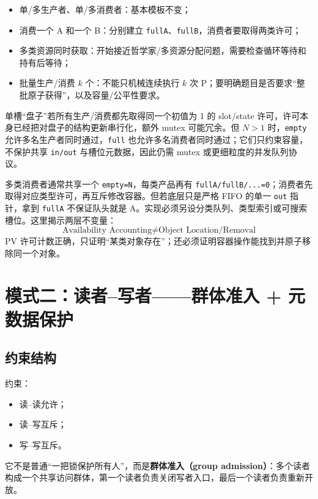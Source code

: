 \documentclass[11pt,a4paper]{ctexart}
\newcommand{\kw}[1]{\textbf{#1}}
\newcommand{\code}[1]{\texttt{#1}}
\begin{document}
\begin{itemize}
\item 单/多生产者、单/多消费者：基本模板不变；
\item 消费一个 A 和一个 B：分别建立 \code{fullA}、\code{fullB}，消费者要取得两类许可；
\item 多类资源同时获取：开始接近哲学家/多资源分配问题，需要检查循环等待和持有后等待；
\item 批量生产/消费 $k$ 个：不能只机械连续执行 $k$ 次 P；要明确题目是否要求“整批原子获得”，以及容量/公平性要求。
\end{itemize}

\begin{exam}
单槽“盘子”若所有生产/消费都先取得同一个初值为 1 的 slot/state 许可，许可本身已经把对盘子的结构更新串行化，额外 mutex 可能冗余。但 $N>1$ 时，\code{empty} 允许多名生产者同时通过，\code{full} 也允许多名消费者同时通过；它们只约束容量，不保护共享 \code{in/out} 与槽位元数据，因此仍需 mutex 或更细粒度的并发队列协议。
\end{exam}

\begin{method}
多类消费者通常共享一个 \code{empty=N}，每类产品再有 \code{fullA/fullB/...=0}；消费者先取得对应类型许可，再互斥修改容器。但若底层只是严格 FIFO 的单一 \code{out} 指针，拿到 \code{fullA} 不保证队头就是 A。实现必须另设分类队列、类型索引或可搜索槽位。这里揭示两层不变量：
\[
\boxed{\text{Availability Accounting}\neq\text{Object Location/Removal}}
\]
PV 许可计数正确，只证明“某类对象存在”；还必须证明容器操作能找到并原子移除同一个对象。
\end{method}

\section{模式二：读者--写者——群体准入 + 元数据保护}

\subsection{约束结构}

约束：
\begin{itemize}
\item 读--读允许；
\item 读--写互斥；
\item 写--写互斥。
\end{itemize}
它不是普通“一把锁保护所有人”，而是\kw{群体准入（group admission）}：多个读者构成一个共享访问群体，第一个读者负责关闭写者入口，最后一个读者负责重新开放。
\end{document}
